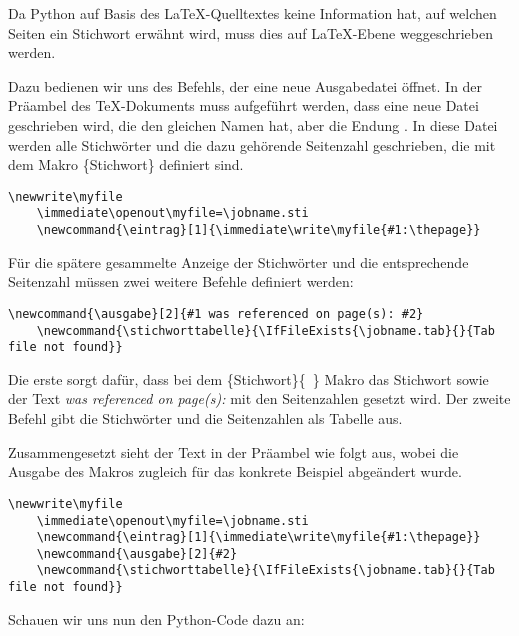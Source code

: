 \documentclass[ngerman]{dtk}
\newcommand{\eintrag}[1]{\immediate\write\myfile{#1:\thepage}}
\newcommand{\ausgabe}[2]{#2}
\newcommand{\stichworttabelle}{\IfFileExists{\jobname.tab}{}{Tab file not found}}
\begin{document}
Da Python auf Basis des \LaTeX-Quelltextes keine Information hat, auf welchen Seiten ein Stichwort erwähnt wird, muss dies auf \LaTeX -Ebene weggeschrieben werden. 

Dazu bedienen wir uns des  Befehls, der eine neue Ausgabedatei öffnet.  In der Präambel des \TeX-Dokuments muss aufgeführt werden, dass eine neue Datei geschrieben wird, die den gleichen Namen hat, aber die Endung . In diese Datei werden alle Stichwörter und die dazu gehörende Seitenzahl geschrieben, 
die mit dem Makro \{Stichwort\}  definiert sind.
\begin{lstlisting}[style=nonumber]
	\newwrite\myfile
	\immediate\openout\myfile=\jobname.sti
	\newcommand{\eintrag}[1]{\immediate\write\myfile{#1:\thepage}}
\end{lstlisting}

Für die spätere gesammelte Anzeige der Stichwörter und die entsprechende Seitenzahl müssen zwei weitere Befehle definiert 
werden:

\begin{lstlisting}[style=nonumber]
	\newcommand{\ausgabe}[2]{#1 was referenced on page(s): #2}
	\newcommand{\stichworttabelle}{\IfFileExists{\jobname.tab}{}{Tab file not found}}
\end{lstlisting}

Die erste sorgt dafür, dass bei dem  \{Stichwort\}\{~\}  Makro das Stichwort sowie der Text 
\emph{was referenced on page(s):} mit den Seitenzahlen gesetzt wird. Der zweite Befehl gibt die Stichwörter und die Seitenzahlen als Tabelle aus.

Zusammengesetzt sieht der Text in der Präambel wie folgt aus,
wobei die Ausgabe des  Makros zugleich für das konkrete Beispiel abgeändert wurde.
\begin{lstlisting}[style=number]
	\newwrite\myfile
	\immediate\openout\myfile=\jobname.sti
	\newcommand{\eintrag}[1]{\immediate\write\myfile{#1:\thepage}}
	\newcommand{\ausgabe}[2]{#2}
	\newcommand{\stichworttabelle}{\IfFileExists{\jobname.tab}{}{Tab file not found}}
\end{lstlisting}

Schauen wir uns nun den Python-Code dazu an:
\end{document}
